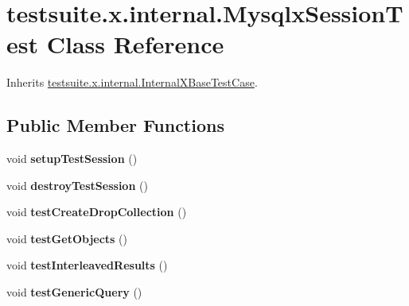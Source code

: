 \hypertarget{classtestsuite_1_1x_1_1internal_1_1_mysqlx_session_test}{}\section{testsuite.\+x.\+internal.\+Mysqlx\+Session\+Test Class Reference}
\label{classtestsuite_1_1x_1_1internal_1_1_mysqlx_session_test}


Inherits \mbox{\hyperlink{classtestsuite_1_1x_1_1internal_1_1_internal_x_base_test_case}{testsuite.\+x.\+internal.\+Internal\+X\+Base\+Test\+Case}}.

\subsection*{Public Member Functions}
\begin{DoxyCompactItemize}
\item 
\mbox{\label{classtestsuite_1_1x_1_1internal_1_1_mysqlx_session_test_ae6b3b8eb8585b32120f3ae453cbbca59}} 
void {\bfseries setup\+Test\+Session} ()
\item 
\mbox{\label{classtestsuite_1_1x_1_1internal_1_1_mysqlx_session_test_a6fbf2b0b0b4206849d2871414fbd136d}} 
void {\bfseries destroy\+Test\+Session} ()
\item 
\mbox{\label{classtestsuite_1_1x_1_1internal_1_1_mysqlx_session_test_a445003cabcccd35700a43be68d69c185}} 
void {\bfseries test\+Create\+Drop\+Collection} ()
\item 
\mbox{\label{classtestsuite_1_1x_1_1internal_1_1_mysqlx_session_test_ab16c60a2c7a6c7353e27ffdb0e5217a0}} 
void {\bfseries test\+Get\+Objects} ()
\item 
\mbox{\label{classtestsuite_1_1x_1_1internal_1_1_mysqlx_session_test_a95056ffc22da5604859be3d0c9bd16fb}} 
void {\bfseries test\+Interleaved\+Results} ()
\item 
\mbox{\label{classtestsuite_1_1x_1_1internal_1_1_mysqlx_session_test_af28cb4654c36218a22a00f110749c6ed}} 
void {\bfseries test\+Generic\+Query} ()
\end{DoxyCompactItemize}
